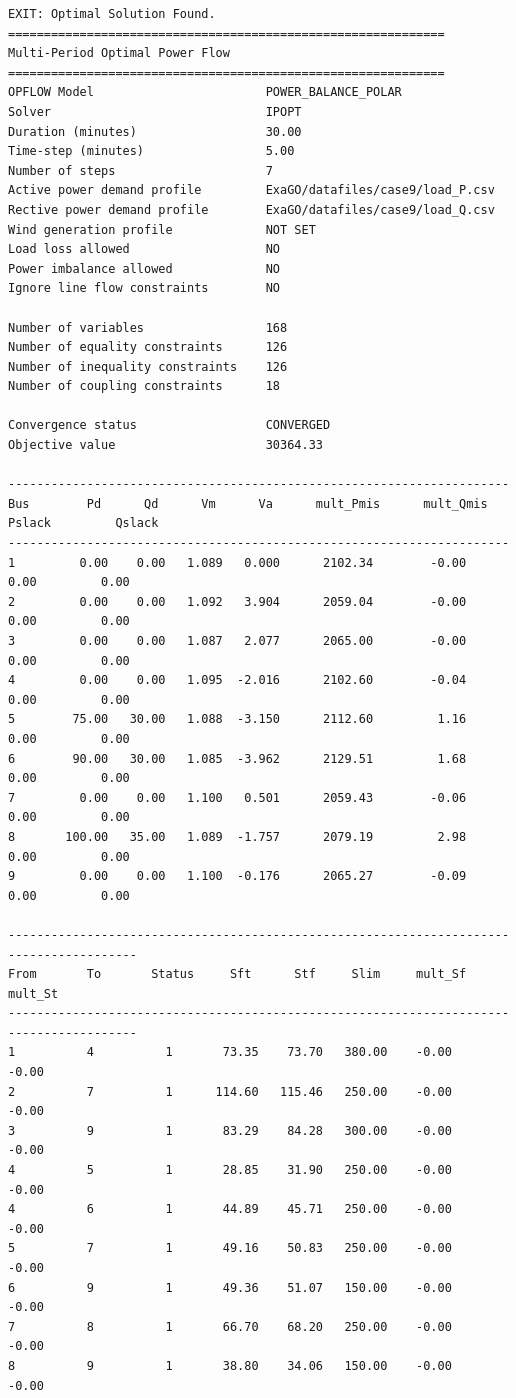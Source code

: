 \begin{lstlisting}
EXIT: Optimal Solution Found.
=============================================================
Multi-Period Optimal Power Flow
=============================================================
OPFLOW Model                        POWER_BALANCE_POLAR
Solver                              IPOPT
Duration (minutes)                  30.00
Time-step (minutes)                 5.00 
Number of steps                     7
Active power demand profile         ExaGO/datafiles/case9/load_P.csv
Rective power demand profile        ExaGO/datafiles/case9/load_Q.csv
Wind generation profile             NOT SET
Load loss allowed                   NO
Power imbalance allowed             NO
Ignore line flow constraints        NO

Number of variables                 168
Number of equality constraints      126
Number of inequality constraints    126
Number of coupling constraints      18

Convergence status                  CONVERGED
Objective value                     30364.33

----------------------------------------------------------------------
Bus        Pd      Qd      Vm      Va      mult_Pmis      mult_Qmis      Pslack         Qslack        
----------------------------------------------------------------------
1         0.00    0.00   1.089   0.000      2102.34        -0.00         0.00         0.00
2         0.00    0.00   1.092   3.904      2059.04        -0.00         0.00         0.00
3         0.00    0.00   1.087   2.077      2065.00        -0.00         0.00         0.00
4         0.00    0.00   1.095  -2.016      2102.60        -0.04         0.00         0.00
5        75.00   30.00   1.088  -3.150      2112.60         1.16         0.00         0.00
6        90.00   30.00   1.085  -3.962      2129.51         1.68         0.00         0.00
7         0.00    0.00   1.100   0.501      2059.43        -0.06         0.00         0.00
8       100.00   35.00   1.089  -1.757      2079.19         2.98         0.00         0.00
9         0.00    0.00   1.100  -0.176      2065.27        -0.09         0.00         0.00

----------------------------------------------------------------------------------------
From       To       Status     Sft      Stf     Slim     mult_Sf  mult_St 
----------------------------------------------------------------------------------------
1          4          1       73.35    73.70   380.00    -0.00    -0.00
2          7          1      114.60   115.46   250.00    -0.00    -0.00
3          9          1       83.29    84.28   300.00    -0.00    -0.00
4          5          1       28.85    31.90   250.00    -0.00    -0.00
4          6          1       44.89    45.71   250.00    -0.00    -0.00
5          7          1       49.16    50.83   250.00    -0.00    -0.00
6          9          1       49.36    51.07   150.00    -0.00    -0.00
7          8          1       66.70    68.20   250.00    -0.00    -0.00
8          9          1       38.80    34.06   150.00    -0.00    -0.00


\end{lstlisting}
